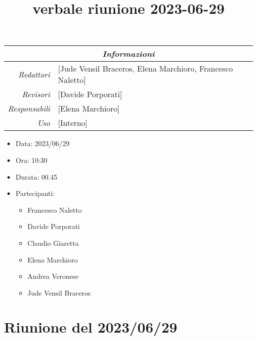 \documentclass[12pt]{article}
\begin{document}
\graphicspath{ {../../templates/img} }

\title{verbale riunione 2023-06-29}

\firstPage
\maketitle

\begin{center}
\begin{tabular}{r | l}
    \multicolumn{2}{c}{\textit{Informazioni}}\\
    \hline
    
        \textit{Redattori} &
        [Jude Vensil Braceros, Elena Marchioro, Francesco Naletto]\makecell{}\\
    
        \textit{Revisori} &
        [Davide Porporati]\makecell{}\\
        \textit{Responsabili} &
        [Elena Marchioro]\makecell{}\\
            \textit{Uso} & 
            [Interno]\makecell{}\\
\end{tabular}
    \begin{itemize}
    \item[] Data: 2023/06/29
    \item[] Ora: 10:30
    \item[] Durata: 00.45
    \item[] Partecipanti:
    \begin{itemize}
    \item[] Francesco Naletto
    \item[] Davide Porporati
    \item[] Claudio Giaretta
    \item[] Elena Marchioro
    \item[] Andrea Veronese
    \item[] Jude Vensil Braceros
    \end{itemize}
\end{itemize}
\end{center}


\tableofcontents
\printindex 
\section{Riunione del 2023/06/29}
\end{document}
